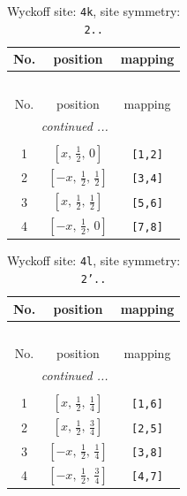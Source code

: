 \documentclass[fleqn,8pt]{jsarticle}
\begin{document}
\renewcommand{\arraystretch}{1.2}
\begin{longtable}{ccc}
\caption{Wyckoff site: {\tt 4k}, site symmetry: {\tt 2..}}
 \\
 \hline \hline
No. & position & mapping \\ \hline \endfirsthead

\multicolumn{2}{l}{\tablename\ \thetable{}} \\
 \hline \hline
No. & position & mapping \\ \hline \endhead

 \hline \hline
\multicolumn{2}{r}{\footnotesize\it continued ...} \\ \endfoot

 \hline \hline
\multicolumn{2}{r}{} \\ \endlastfoot

1 & $\left[ x,\, \frac{1}{2},\, 0 \right]$ & {\tt [1,2]} \\ \hline
2 & $\left[ - x,\, \frac{1}{2},\, \frac{1}{2} \right]$ & {\tt [3,4]} \\ \hline
3 & $\left[ x,\, \frac{1}{2},\, \frac{1}{2} \right]$ & {\tt [5,6]} \\ \hline
4 & $\left[ - x,\, \frac{1}{2},\, 0 \right]$ & {\tt [7,8]} \\
\end{longtable}
\renewcommand{\arraystretch}{1.2}
\begin{longtable}{ccc}
\caption{Wyckoff site: {\tt 4l}, site symmetry: {\tt 2'..}}
 \\
 \hline \hline
No. & position & mapping \\ \hline \endfirsthead

\multicolumn{2}{l}{\tablename\ \thetable{}} \\
 \hline \hline
No. & position & mapping \\ \hline \endhead

 \hline \hline
\multicolumn{2}{r}{\footnotesize\it continued ...} \\ \endfoot

 \hline \hline
\multicolumn{2}{r}{} \\ \endlastfoot

1 & $\left[ x,\, \frac{1}{2},\, \frac{1}{4} \right]$ & {\tt [1,6]} \\ \hline
2 & $\left[ x,\, \frac{1}{2},\, \frac{3}{4} \right]$ & {\tt [2,5]} \\ \hline
3 & $\left[ - x,\, \frac{1}{2},\, \frac{1}{4} \right]$ & {\tt [3,8]} \\ \hline
4 & $\left[ - x,\, \frac{1}{2},\, \frac{3}{4} \right]$ & {\tt [4,7]} \\
\end{longtable}
\end{document}
